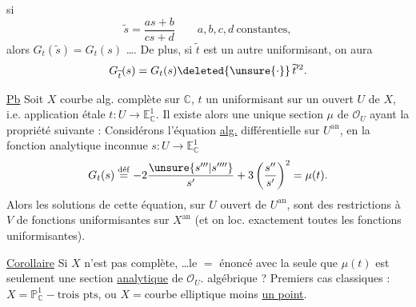 si 
\[
\widetilde s=\frac{as+b}{cs+d}\qquad a,b,c,d\ \text{constantes},
\]
alors $G_t(\widetilde s)=G_t(s)$ \ldots. De plus, si $\widetilde t$ est un autre uniformisant, on aura
\[
G_{\widetilde t}(s)=G_t(s)\deleted{\unsure{\cdot}}\,\widetilde t'^2.
\]

\uline{Pb} Soit $X$ courbe alg. complète sur $\mathbb C$, $t$ un uniformisant sur un ouvert $U$ de $X$, i.e. application étale $t:U\longrightarrow\mathbb E^1_{\mathbb C}$. Il existe alors une unique section $\mu$ de $\mathcal O_U$ ayant la propriété suivante : Considérons l'équation \uline{alg.} différentielle sur $U^{\mathrm{an}}$, en la fonction analytique inconnue $s:U\longrightarrow\mathbb E^1_{\mathbb C}$
\[
G_t(s)\overset{\mathrm{d\acute ef}}{=}-2\frac{\unsure{s'''|s''''}}{s'}+3\left(\frac{s''}{s'}\right)^2=\mu(t).
\]
Alors les solutions de cette équation, sur $U$
ouvert  de $U^{\mathrm{an}}$, sont des restrictions à $V$ de fonctions  uniformisantes sur $X^{\mathrm{an}}$ (et on   loc. exactement toutes les fonctions uniformisantes).

\uline{Corollaire} Si $X$ n'est pas complète, \ldots le $=$ énoncé avec la seule  que $\mu(t)$ est seulement une section \uline{analytique} de $\mathcal O_U$.   algébrique ? Premiers cas classiques : $X=\mathbb P^1_{\mathbb C}-\text{trois pts}$, ou $X=\text{courbe elliptique}$ moins \uline{un point}.

